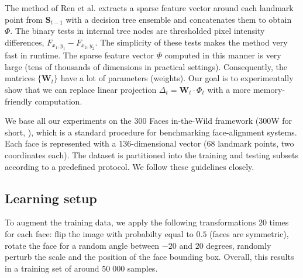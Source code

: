 \documentclass{article}
\begin{document}
	The method of Ren et al. \cite{lbf} extracts a sparse feature vector around each landmark point from $\mathbf{S}_{t-1}$ with a decision tree ensemble
	and concatenates them to obtain $\Phi$.
	The binary tests in internal tree nodes are thresholded pixel intensity differences, $F_{x_1,y_1}-F_{x_2,y_2}$.
	The simplicity of these tests makes the method very fast in runtime.
	The sparse feature vector $\Phi$ computed in this manner is very large 
	(tens of thousands of dimensions in practical settings).
	Consequently, the matrices $\{\mathbf{W}_t\}$ have a lot of parameters (weights).
	Our goal is to experimentally show that we can replace linear projection $\Delta_t=\mathbf{W}_t\cdot\Phi_t$ with a more memory-friendly computation.

	We base all our experiments on the 300 Faces in-the-Wild framework (300W for short, \cite{300w}),
	which is a standard procedure for benchmarking face-alignment systems.
	Each face is represented with a $136$-dimensional vector ($68$ landmark points, two coordinates each).
	The dataset is partitioned into the training and testing subsets according to a predefined protocol.
	We follow these guidelines closely.

	\subsection{Learning setup}
		To augment the training data, we apply the following transformations $20$ times for each face:
		flip the image with probabilty equal to $0.5$ (faces are symmetric),
		rotate the face for a random angle between $-20$ and $20$ degrees,
		randomly perturb the scale and the position of the face bounding box.
		Overall, this results in a training set of around $50\;000$ samples.
\end{document}
